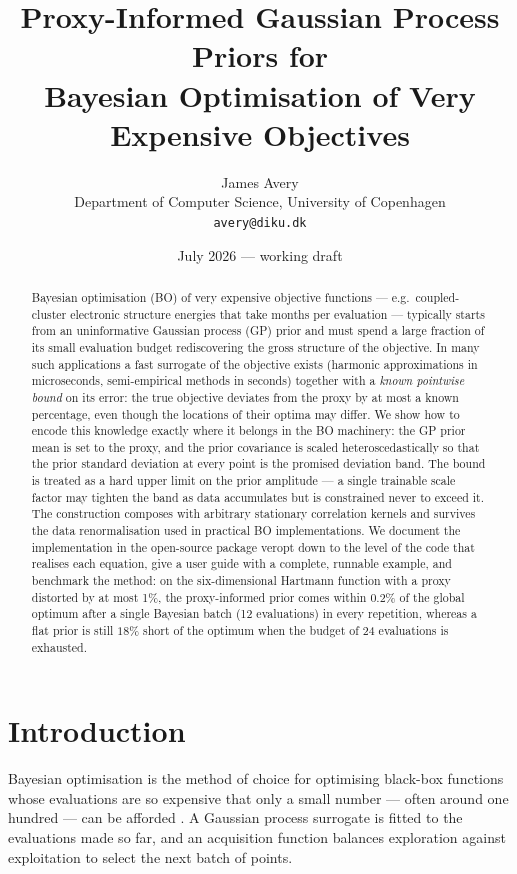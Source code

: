 \documentclass[11pt,a4paper]{article}
\title{Proxy-Informed Gaussian Process Priors for\\
Bayesian Optimisation of Very Expensive Objectives}
\author{James Avery\\
  \small Department of Computer Science, University of Copenhagen\\
  \small \texttt{avery@diku.dk}}
\date{July 2026 --- working draft}
\newcommand{\veropt}{\textsf{veropt}}
\begin{document}
\maketitle

\begin{abstract}
Bayesian optimisation (BO) of very expensive objective functions --- e.g.\
coupled-cluster electronic structure energies that take months per evaluation
--- typically starts from an uninformative Gaussian process (GP) prior and
must spend a large fraction of its small evaluation budget rediscovering the
gross structure of the objective. In many such applications a fast surrogate
of the objective exists (harmonic approximations in microseconds,
semi-empirical methods in seconds) together with a \emph{known pointwise bound}
on its error: the true objective deviates from the proxy by at most a known
percentage, even though the locations of their optima may differ. We show how
to encode this knowledge exactly where it belongs in the BO machinery: the GP
prior mean is set to the proxy, and the prior covariance is scaled
heteroscedastically so that the prior standard deviation at every point is the
promised deviation band. The bound is treated as a hard upper limit on the
prior amplitude --- a single trainable scale factor may tighten the band as
data accumulates but is constrained never to exceed it. The construction
composes with arbitrary stationary correlation kernels and survives the data
renormalisation used in practical BO implementations. We document the
implementation in the open-source package \veropt{} down to the level of the
code that realises each equation, give a user guide with a complete,
runnable example, and benchmark the method: on the six-dimensional Hartmann
function with a proxy distorted by at most 1\%, the proxy-informed prior comes
within $0.2\%$ of the global optimum after a single Bayesian batch (12
evaluations) in every repetition, whereas a flat prior is still $18\%$ short
of the optimum when the budget of 24 evaluations is exhausted.
\end{abstract}

\section{Introduction}

Bayesian optimisation is the method of choice for optimising black-box
functions whose evaluations are so expensive that only a small number ---
often around one hundred --- can be afforded
\citep{shahriari2016, frazier2018}. A Gaussian process surrogate is fitted to
the evaluations made so far, and an acquisition function balances exploration
against exploitation to select the next batch of points.
\end{document}

